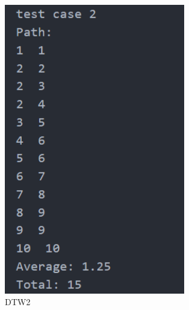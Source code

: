 \documentclass[12pt,a4paper]{article}
\theoremstyle{definition}
\begin{document}
\begin{appendices}
\begin{figure}[H] %
\centering %
\includegraphics[width=0.7\textwidth]{3.png} %
\caption{DTW2} %
\label{} %
\end{figure}


\end{appendices}
\end{document}
